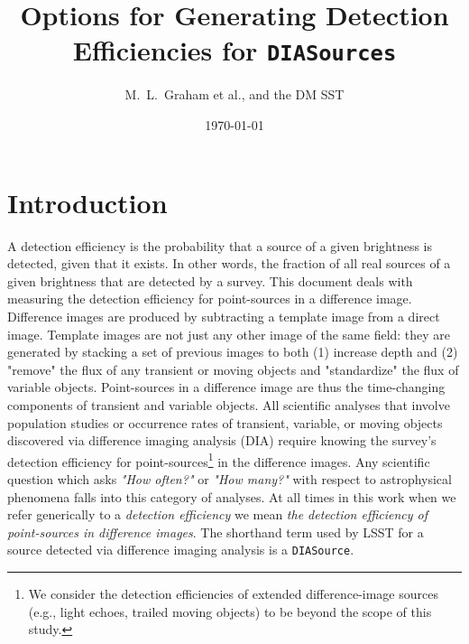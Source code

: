 \documentclass[DM,lsstdraft,toc]{lsstdoc}
\title[Detection Efficiencies]{Options for Generating Detection Efficiencies for {\tt DIASources}}
\author{M.~L.~Graham et al., and the DM SST}
\date{\today}
\begin{document}
\maketitle



\section{Introduction} \label{sec:intro}


A detection efficiency is the probability that a source of a given brightness is detected, given that it exists. In other words, the fraction of all real sources of a given brightness that are detected by a survey. This document deals with measuring the detection efficiency for point-sources in a difference image. Difference images are produced by subtracting a template image from a direct image. Template images are not just any other image of the same field: they are generated by stacking a set of previous images to both (1) increase depth and (2) "remove" the flux of any transient or moving objects and "standardize" the flux of variable objects. Point-sources in a difference image are thus the time-changing components of transient and variable objects. All scientific analyses that involve population studies or occurrence rates of transient, variable, or moving objects discovered via difference imaging analysis (DIA) require knowing the survey's detection efficiency for point-sources\footnote{We consider the detection efficiencies of extended difference-image sources (e.g., light echoes, trailed moving objects) to be beyond the scope of this study.} in the difference images. Any scientific question which asks {\it "How often?"} or {\it "How many?"} with respect to astrophysical phenomena falls into this category of analyses. At all times in this work when we refer generically to a {\it detection efficiency} we mean {\it the detection efficiency of point-sources in difference images}. The shorthand term used by LSST for a source detected via difference imaging analysis is a {\tt DIASource}. 
\end{document}
